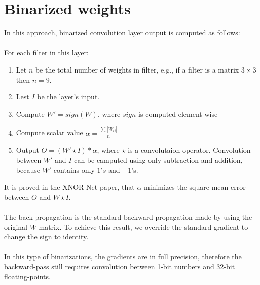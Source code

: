 \documentclass[licencjacka]{pracamgr}
\begin{document}
	\section{Binarized weights}
        In this approach, binarized convolution layer output is computed as follows:
        \\\\
        For each filter in this layer:
        \begin{enumerate}
                \item Let $n$ be the total number of weights in filter, e.g., if a filter is a matrix $3 \times 3$ then $n=9$.
                \item Lest $I$ be the layer's input.
                \item Compute $W' = sign(W)$, where $sign$ is computed element-wise
                \item Compute scalar value $\alpha = \frac{\sum{|W_{ij}|}}{n}$
                \item Output $O = (W'\star I) *\alpha$, where $\star$ is a convolutaion operator. Convolution between $W'$ and $I$ can be camputed using only subtraction and addition, because $W'$ contains only $1's$ and $-1$'s.
        \end{enumerate}
        
        It is proved in the XNOR-Net paper, that $\alpha$ minimizes the square mean error between $O$ and $W\star I$.
        \\\\
        The back propagation is the standard backward propagation made by using the original $W$ matrix. To achieve this result, we override the standard gradient to change the sign to identity.
        \\\\
        In this type of binarizations, the gradients are in full precision, therefore the backward-pass still requires convolution between 1-bit numbers and 32-bit floating-points.
\end{document}
